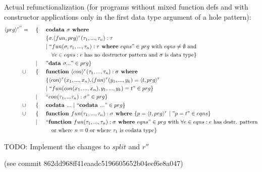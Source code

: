 \documentclass[11pt]{article} %
\begin{document}
Actual refunctionalization (for programs without mixed function defs and with constructor applications only in the first data type argument of a hole pattern):
\begin{alignat*}{3}
\langle prg \rangle^{r''} & = ~&& \{ ~&& \textrm{\textbf{codata }} \sigma \textrm{\textbf{ where }} \\
& && && \{ \sigma .\langle fun, prg \rangle^r (\tau_1, ..., \tau_n): \tau \\
& && && | ~ `` fun (\sigma, \tau_1, ..., \tau_n): \tau \textrm{\textbf{ where }} eqns " \in prg \textrm{ with } eqns \neq \emptyset \textrm{ and } \\
& && &&\quad \forall e \in eqns: e \textrm{ has no destructor pattern and } \sigma \textrm{ is data type}  \} \\
& && | && "\textrm{\textbf{data }} \sigma ..." \in prg \} \\
& \cup && \{ && \textrm{\textbf{function }} \langle con \rangle^r (\tau_1, ..., \tau_n): \sigma \textrm{\textbf{ where }} \\
& && && \{ \langle con \rangle^r (x_1, ..., x_n) .\langle fun \rangle^r (y_1, ..., y_k) = \langle t, prg \rangle^r \\
& && && | ~ `` fun(con(x_1, ..., x_n), y_1, ..., y_k) = t " \in prg \} \\
& && | && `` con(\tau_1, ... \tau_n): \sigma " \in prg \} \\
& \cup && \{ && \textrm{\textbf{codata }} ... ~ | ~ `` \textrm{\textbf{codata }} ... " \in prg \} \\
& \cup && \{ && \textrm{\textbf{function }} fun(\tau_1, ..., \tau_n): \sigma \textrm{\textbf{ where }} \{ p = \langle t, prg \rangle^r ~ | ~ "p = t" \in eqns \} \\
& && | && `` \textrm{\textbf{function }} fun(\tau_1, ..., \tau_n): \sigma \textrm{\textbf{ where }} eqns " \in prg \textrm{ with } \forall e \in eqns: e \textrm{ has destr. pattern} \\
& && &&\quad \textrm{or where } n = 0 \textrm{ or where } \tau_1 \textrm{ is codata type} \} 
\end{alignat*}

TODO: Implement the changes to $split$ and $r''$

(see commit 862dd968ff41eaadc5196605652b04eef6e8a047)
\end{document}
